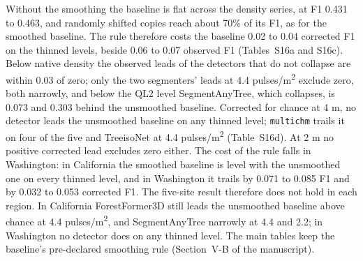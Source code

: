 \documentclass[10pt]{article}
\begin{document}
Without the smoothing the baseline is flat across the density series, at F1
0.431 to 0.463, and randomly shifted copies reach about 70\% of its F1, as for
the smoothed baseline. The rule therefore costs the baseline 0.02 to 0.04
corrected F1 on the thinned levels, beside 0.06 to 0.07 observed F1 (Tables~S16a
and S16c). Below native density the observed leads of the detectors that do not
collapse are within 0.03 of zero; only the two segmenters' leads at 4.4
pulses/m\textsuperscript{2} exclude zero, both narrowly, and below the QL2 level SegmentAnyTree,
which collapses, is 0.073 and 0.303 behind the unsmoothed baseline. Corrected
for chance at 4 m, no detector leads the unsmoothed baseline on any thinned
level; \texttt{multichm} trails it on four of the five and TreeisoNet at 4.4 pulses/m\textsuperscript{2}
(Table~S16d). At 2 m no positive corrected lead excludes zero either. The cost
of the rule falls in Washington: in California the smoothed baseline is level
with the unsmoothed one on every thinned level, and in Washington it trails by
0.071 to 0.085 F1 and by 0.032 to 0.053 corrected F1. The five-site result
therefore does not hold in each region. In California ForestFormer3D still leads
the unsmoothed baseline above chance at 4.4 pulses/m\textsuperscript{2}, and SegmentAnyTree
narrowly at 4.4 and 2.2; in Washington no detector does on any thinned level.
The main tables keep the baseline's pre-declared smoothing rule (Section~V-B of
the manuscript).
\end{document}
